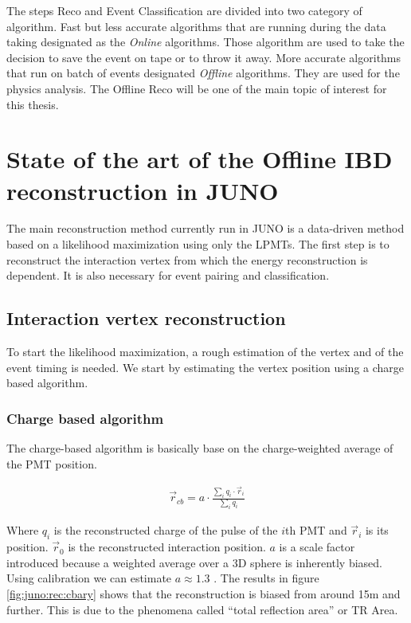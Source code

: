 \documentclass[../main.tex]{subfiles}
\begin{document}
The steps Reco and Event Classification are divided into two category of algorithm. Fast but less accurate algorithms that are running during the data taking designated as the \textit{Online} algorithms. Those algorithm are used to take the decision to save the event on tape or to throw it away. More accurate algorithms that run on batch of events designated \textit{Offline} algorithms. They are used for the physics analysis. The Offline Reco will be one of the main topic of interest for this thesis.

\section{State of the art of the Offline IBD reconstruction in JUNO}
\label{sec:juno:reco}

The main reconstruction method currently run in JUNO is a data-driven method based on a likelihood maximization \cite{wu_new_2019, huang_improving_2021} using only the LPMTs. The first step is to reconstruct the interaction vertex from which the energy reconstruction is dependent. It is also necessary for event pairing and classification.

\subsection{Interaction vertex reconstruction}

To start the likelihood maximization, a rough estimation of the vertex and of the event timing is needed. We start by estimating the vertex position using a charge based algorithm.

\subsubsection{Charge based algorithm}

The charge-based algorithm is basically base on the charge-weighted average of the PMT position.

\begin{align}
  \vec{r}_{cb} = a\cdot\frac{\sum_i q_i \cdot \vec{r}_i}{\sum_i q_i}
\end{align}

Where $q_i$ is the reconstructed charge of the pulse of the $i$th PMT and $\vec{r}_i$ is its position. $\vec{r}_0$ is the reconstructed interaction position. $a$ is a scale factor introduced because a weighted average over a 3D sphere is inherently biased. Using calibration we can estimate $a \approx 1.3$ \cite{li_event_2021}. The results in figure \ref{fig:juno:rec:cbary} shows that the reconstruction is biased from around 15m and further. This is due to the phenomena called ``total reflection area'' or TR Area.
\end{document}
